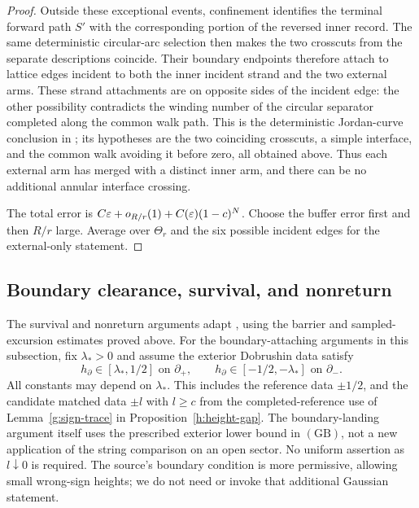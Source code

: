 \begin{proof}
Outside these exceptional events, confinement identifies the terminal
forward path \(S'\) with the corresponding portion of the reversed
inner record. The same deterministic circular-arc selection then
makes the two crosscuts from the separate descriptions coincide. Their
boundary endpoints therefore attach to lattice edges incident to both
the inner incident strand and the two external arms. These strand
attachments are on opposite sides of the incident
edge: the other possibility contradicts the winding number of
the circular separator completed along the common walk path.
This is the deterministic Jordan-curve conclusion in
\cite[final paragraphs of Lemma 3.17]{SSdiscrete}; its hypotheses
are the two coinciding crosscuts, a simple interface, and the
common walk avoiding it before zero, all obtained above.
Thus each external arm has merged with a distinct inner arm,
and there can be no additional annular interface crossing.

The total error is \(C\varepsilon+o_{R/r}(1)+C(\varepsilon)(1-c)^N\).
Choose the buffer error first and then \(R/r\) large.
Average over \(\Theta_r\) and the six possible incident edges
for the external-only statement.
\end{proof}

\subsection{Boundary clearance, survival, and nonreturn}

The survival and nonreturn arguments adapt
\cite[Lemma~3.26, especially equation (3.62)]{SSdiscrete}, using the
barrier and sampled-excursion estimates proved above.
For the boundary-attaching arguments in this subsection, fix
\(\lambda_*>0\) and assume the exterior Dobrushin data satisfy
\[
 h_\partial\in[\lambda_*,1/2]\text{ on }\partial_+,
 \qquad
 h_\partial\in[-1/2,-\lambda_*]\text{ on }\partial_-.
 \tag{GB}
\]
All constants may depend on \(\lambda_*\). This includes the reference
data \(\pm1/2\), and the candidate matched data \(\pm l\) with
\(l\geq c\) from the completed-reference use of Lemma~\ref{g:sign-trace}
in Proposition~\ref{h:height-gap}. The boundary-landing argument itself
uses the prescribed exterior lower bound in \((\mathrm{GB})\), not a
new application of the string comparison on an open sector. No uniform assertion as
\(l\downarrow0\) is required. The source's boundary condition
\cite[condition \((\partial)\), Section 3.7]{SSdiscrete} is more
permissive, allowing small wrong-sign heights; we do not need or invoke
that additional Gaussian statement.

